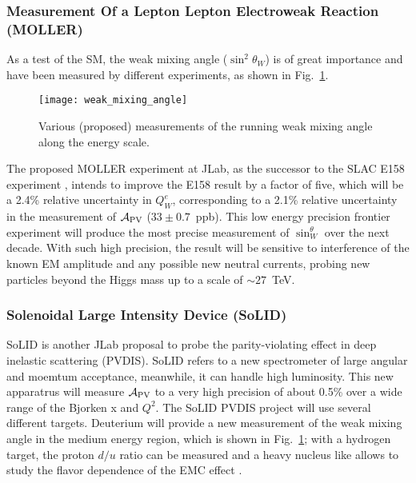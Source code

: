 \subsubsection{Measurement Of a Lepton Lepton Electroweak Reaction (MOLLER)}
As a test of the SM, the weak mixing angle ($\sin^2\theta_W$) is of great importance 
and have been measured by different experiments, as shown in Fig.~\ref{fig:weak_mixing_angle}.

\begin{figure}[!h]
    \centering
    \texttt{[image: weak\_mixing\_angle]}
    \caption{Various (proposed) measurements of the running weak mixing angle
    along the energy scale. }
    \label{fig:weak_mixing_angle}
\end{figure}

The proposed MOLLER experiment at JLab, as the successor to the SLAC E158 experiment \cite{PhysRevLett.95.081601},
intends to improve the E158 result by a factor of five, which will be a 2.4\%
relative uncertainty in $Q_W^e$, corresponding to a 2.1\% relative uncertainty
in the measurement of $\mathcal{A}_{\text{PV}}$ ($33 \pm 0.7$~ppb).
This low energy precision frontier experiment will produce the most precise 
measurement of $\sin^\theta_W$ over the next decade. With such high precision,
the result will be sensitive to interference of the known EM amplitude and any
possible new neutral currents, probing new particles beyond the Higgs mass up
to a scale of $\sim 27$~TeV.

\subsubsection{Solenoidal Large Intensity Device (SoLID)}
SoLID is another JLab proposal to probe the parity-violating effect in deep inelastic
scattering (PVDIS). SoLID refers to a new spectrometer of large angular and moemtum
acceptance, meanwhile, it can handle high luminosity. This new apparatrus will
measure $\mathcal{A}_{\text{PV}}$ to a very high precision of about 0.5\% over a wide
range of the Bjorken x and $Q^2$. The SoLID PVDIS project will use several
different targets. Deuterium will provide a new measurement of the weak mixing angle
in the medium energy region, which is shown in Fig.~\ref{fig:weak_mixing_angle};
with a hydrogen target, the proton $d/u$ ratio can be measured and a heavy
nucleus like \Pb allows to study the flavor dependence of the EMC effect \cite{Aubert:142300}.


